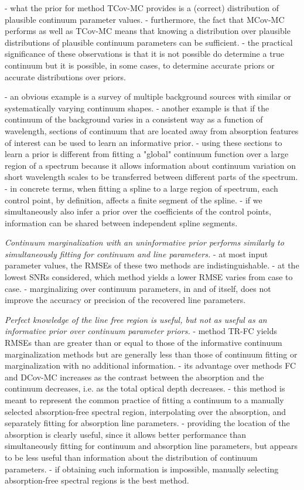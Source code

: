 \documentclass[trackchanges]{aastex62}
\begin{document}
{- what the prior for method TCov-MC provides is a (correct) distribution of plausible continuum parameter values.
- furthermore, the fact that MCov-MC performs as well as TCov-MC means that knowing a distribution over plausible distributions of plausible continuum parameters can be sufficient.
- the practical significance of these observations is that it is not possible do determine a true continuum but it is possible, in some cases, to determine accurate priors or accurate distributions over priors.

- an obvious example is a survey of multiple background sources with similar or systematically varying continuum shapes.
- another example is that if the continuum of the background varies in a consistent way as a function of wavelength, sections of continuum that are located away from absorption features of interest can be used to learn an informative prior.
- using these sections to learn a prior is different from fitting a "global" continuum function over a large region of a spectrum because it allows information about continuum variation on short wavelength scales to be transferred between different parts of the spectrum.
- in concrete terms, when fitting a spline to a large region of spectrum, each control point, by definition, affects a finite segment of the spline.
- if we simultaneously also infer a prior over the coefficients of the control points, information can be shared between independent spline segments.

\emph{Continuum marginalization with an uninformative prior performs similarly to simultaneously fitting for continuum and line parameters.}
- at most input parameter values, the RMSEs of these two methods are indistinguishable.
- at the lowest SNRs considered, which method yields a lower RMSE varies from case to case.
- marginalizing over continuum parameters, in and of itself, does not improve the accuracy or precision of the recovered line parameters.

\emph{Perfect knowledge of the line free region is useful, but not as useful as an informative prior over continuum parameter priors.}
- method TR-FC yields RMSEs than are greater than or equal to those of the informative continuum marginalization methods but are generally less than those of continuum fitting or marginalization with no additional information.
- its advantage over methods FC and DCov-MC increases as the contrast between the absorption and the continuum decreases, i.e. as the total optical depth decreases.
- this method is meant to represent the common practice of fitting a continuum to a manually selected absorption-free spectral region, interpolating over the absorption, and separately fitting for absorption line parameters.
- providing the location of the absorption is clearly useful, since it allows better performance than simultaneously fitting for continuum and absorption line parameters, but appears to be less useful than information about the distribution of continuum parameters.
- if obtaining such information is impossible, manually selecting absorption-free spectral regions is the best method.


}
\end{document}
